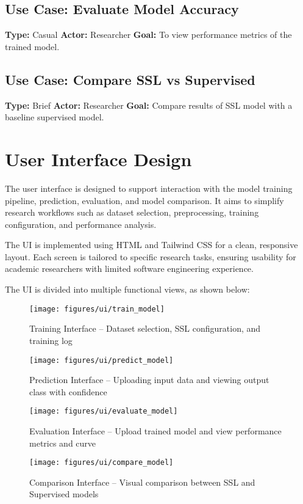 \subsection*{Use Case: Evaluate Model Accuracy}
\textbf{Type:} Casual
\textbf{Actor:} Researcher
\textbf{Goal:} To view performance metrics of the trained model.

\subsection*{Use Case: Compare SSL vs Supervised}
\textbf{Type:} Brief
\textbf{Actor:} Researcher
\textbf{Goal:} Compare results of SSL model with a baseline supervised model.
\newpage

\section{User Interface Design}
\label{sec:user-interface-design}

The user interface is designed to support interaction with the model training pipeline, prediction, evaluation, and model comparison.
It aims to simplify research workflows such as dataset selection, preprocessing, training configuration, and performance analysis.

The UI is implemented using HTML and Tailwind CSS for a clean, responsive layout.
Each screen is tailored to specific research tasks, ensuring usability for academic researchers with limited software engineering experience.

The UI is divided into multiple functional views, as shown below:

\begin{figure}[h]
    \centering
    \texttt{[image: figures/ui/train\_model]}
    \caption{Training Interface – Dataset selection, SSL configuration, and training log}
    \label{fig:figure2}
\end{figure}

\begin{figure}[h]
    \centering
    \texttt{[image: figures/ui/predict\_model]}
    \caption{Prediction Interface – Uploading input data and viewing output class with confidence}
    \label{fig:figure3}
\end{figure}

\begin{figure}[h]
    \centering
    \texttt{[image: figures/ui/evaluate\_model]}
    \caption{Evaluation Interface – Upload trained model and view performance metrics and curve}
    \label{fig:figure4}
\end{figure}

\begin{figure}[h]
    \centering
    \texttt{[image: figures/ui/compare\_model]}
    \caption{Comparison Interface – Visual comparison between SSL and Supervised models}
    \label{fig:figure5}
\end{figure}

